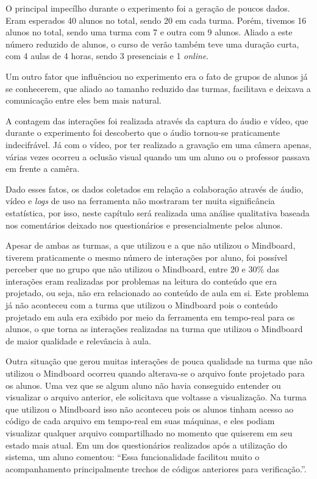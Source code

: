 O principal impecílho durante o experimento foi a geração de poucos dados. Eram esperados 40 alunos no total, sendo 20 em cada turma. Porém, tivemos 16 alunos no total, sendo uma turma com 7 e outra com 9 alunos. Aliado a este número reduzido de alunos, o curso de verão também teve uma duração curta, com 4 aulas de 4 horas, sendo 3 presenciais e 1 \emph{online}.

Um outro fator que influênciou no experimento era o fato de grupos de alunos já se conhecerem, que aliado ao tamanho reduzido das turmas, facilitava e deixava a comunicação entre eles bem mais natural.

A contagem das interações foi realizada através da captura do áudio e vídeo, que durante o experimento foi descoberto que o áudio tornou-se praticamente indecifrável. Já com o vídeo, por ter realizado a gravação em uma câmera apenas, várias vezes ocorreu a oclusão visual quando um um aluno ou o professor passava em frente a camêra.

Dado esses fatos, os dados coletados em relação a colaboração através de áudio, vídeo e \emph{logs} de uso na ferramenta não mostraram ter muita significância estatística, por isso, neste capítulo será realizada uma análise qualitativa baseada nos comentários deixado nos questionários e presencialmente pelos alunos.

Apesar de ambas as turmas, a que utilizou e a que não utilizou o Mindboard, tiverem praticamente o mesmo número de interações por aluno, foi possível perceber que no grupo que não utilizou o Mindboard, entre 20 e 30\% das interações eram realizadas por problemas na leitura do conteúdo que era projetado, ou seja, não era relacionado ao conteúdo de aula em si. Este problema já não aconteceu com a turma que utilizou o Mindboard pois o conteúdo projetado em aula era exibido por meio da ferramenta em tempo-real para os alunos, o que torna as interações realizadas na turma que utilizou o Mindboard de maior qualidade e relevância à aula.

Outra situação que gerou muitas interações de pouca qualidade na turma que não utilizou o Mindboard ocorreu quando alterava-se o arquivo fonte projetado para os alunos. Uma vez que se algum aluno não havia conseguido entender ou visualizar o arquivo anterior, ele solicitava que voltasse a visualização. Na turma que utilizou o Mindboard isso não aconteceu pois os alunos tinham acesso ao código de cada arquivo em tempo-real em suas máquinas, e eles podiam visualizar qualquer arquivo compartilhado no momento que quiserem em seu estado mais atual. Em um dos questionários realizados após a utilização do sistema, um aluno comentou: ``Essa funcionalidade facilitou muito o acompanhamento principalmente trechos de códigos anteriores para verificação.''.

